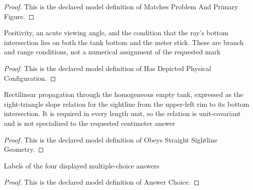 \begin{proof}
  This is the declared model definition of Matches Problem And Primary Figure.
\end{proof}
\begin{definition}
  \label{def:physics:phyx-mini-0070:phyxminiproblems-problemphyxmini0070-hasdepictedphysicalconfiguration}
  Positivity, an acute viewing angle, and the condition that the ray's bottom intersection lies on both the tank bottom and the meter stick. These are branch and range conditions, not a numerical assignment of the requested mark
\end{definition}
\begin{proof}
  This is the declared model definition of Has Depicted Physical Configuration.
\end{proof}
\begin{definition}
  \label{def:physics:phyx-mini-0070:phyxminiproblems-problemphyxmini0070-obeysstraightsightlinegeometry}
  Rectilinear propagation through the homogeneous empty tank, expressed as the right-triangle slope relation for the sightline from the upper-left rim to its bottom intersection. It is required in every length unit, so the relation is unit-covariant and is not specialized to the requested centimeter answer
\end{definition}
\begin{proof}
  This is the declared model definition of Obeys Straight Sightline Geometry.
\end{proof}
\begin{definition}
  \label{def:physics:phyx-mini-0070:phyxminiproblems-problemphyxmini0070-answerchoice}
  Labels of the four displayed multiple-choice answers
\end{definition}
\begin{proof}
  This is the declared model definition of Answer Choice.
\end{proof}
